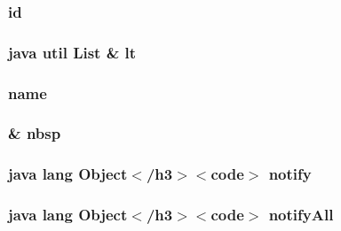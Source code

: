 \hypertarget{_sensor_8html_acf2488b95c97e0378c9bf49de3b50f28}{
\subsubsection[{id}]{\setlength{\rightskip}{0pt plus 5cm}id}}\label{_sensor_8html_acf2488b95c97e0378c9bf49de3b50f28}
\hypertarget{_sensor_8html_ae966755cef9ee47d2c55292fa9976d38}{
\subsubsection[{lt}]{\setlength{\rightskip}{0pt plus 5cm}java util List \& lt}}\label{_sensor_8html_ae966755cef9ee47d2c55292fa9976d38}
\hypertarget{_sensor_8html_ab74e6bf80237ddc4109968cedc58c151}{
\subsubsection[{name}]{\setlength{\rightskip}{0pt plus 5cm}name}}\label{_sensor_8html_ab74e6bf80237ddc4109968cedc58c151}
\hypertarget{_sensor_8html_aef915316f784c9063d942974538301a6}{
\subsubsection[{nbsp}]{\setlength{\rightskip}{0pt plus 5cm}\& nbsp}}\label{_sensor_8html_aef915316f784c9063d942974538301a6}
\hypertarget{_sensor_8html_ae99ae10b5010594dbda4794e02db271b}{
\subsubsection[{notify}]{\setlength{\rightskip}{0pt plus 5cm}java lang Object$<$/h3$>$$<$code$>$ notify}}\label{_sensor_8html_ae99ae10b5010594dbda4794e02db271b}
\hypertarget{_sensor_8html_a1279357e6e09e33e75b55eb05fdb6436}{
\subsubsection[{notify\-All}]{\setlength{\rightskip}{0pt plus 5cm}java lang Object$<$/h3$>$$<$code$>$ notify\-All}}\label{_sensor_8html_a1279357e6e09e33e75b55eb05fdb6436}
